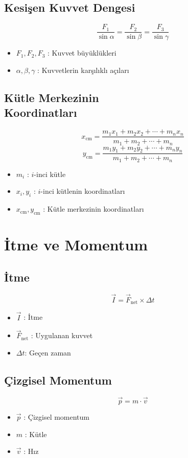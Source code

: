 \documentclass[a4paper, 11pt, titlepage]{article}
\begin{document}
\subsection{Kesişen Kuvvet Dengesi}
\[
\frac{F_1}{\sin \alpha} = \frac{F_2}{\sin \beta} = \frac{F_3}{\sin \gamma}
\]
\begin{itemize}
  \item $F_1, F_2, F_3$ : Kuvvet büyüklükleri
  \item $\alpha, \beta, \gamma$ : Kuvvetlerin karşılıklı açıları
\end{itemize}


\subsection[Kütle Merkezinin Koordinatlar]{Kütle Merkezinin \\Koordinatları}
\[
x_{\mathrm{cm}} = \frac{m_1 x_1 + m_2 x_2 + \cdots + m_n x_n}{m_1 + m_2 + \cdots + m_n}
\]
\[
y_{\mathrm{cm}} = \frac{m_1 y_1 + m_2 y_2 + \cdots + m_n y_n}{m_1 + m_2 + \cdots + m_n}
\]
\begin{itemize}
  \item $m_i$ : $i$-inci kütle
  \item $x_i, y_i$ : $i$-inci kütlenin koordinatları
  \item $x_{\mathrm{cm}}, y_{\mathrm{cm}}$ : Kütle merkezinin koordinatları
\end{itemize}
\section{İtme ve Momentum}
\subsection{İtme}
\[
\vec{I} = \vec{F}_{\mathrm{net}} \times \Delta t
\]
\begin{itemize}
  \item $\vec{I}$ : İtme
  \item $\vec{F}_{\mathrm{net}}$ : Uygulanan kuvvet
  \item $\Delta t$: Geçen zaman
\end{itemize}



\subsection{Çizgisel Momentum}
\[
\vec{p} = m \cdot \vec{v}
\]
\begin{itemize}
  \item $\vec{p}$ : Çizgisel momentum
  \item $m$ : Kütle
  \item $\vec{v}$ : Hız
\end{itemize}
\end{document}
